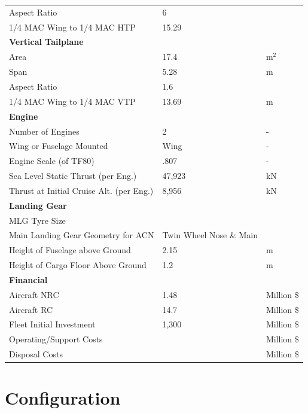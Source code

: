 \documentclass[11pt]{article}
\begin{document}
\begin{center}
\begin{longtable}{lll}
Aspect Ratio & 6 &\\
1/4 MAC Wing to 1/4 MAC HTP & 15.29 \\
\midrule
\textbf{Vertical Tailplane}\\
Area & 17.4 &m$^{2}$\\
Span & 5.28 & m\\
Aspect Ratio & 1.6 &\\
1/4 MAC Wing to 1/4 MAC VTP & 13.69&m \\
\midrule
\textbf{Engine}\\
Number of Engines & 2 & - \\
Wing or Fuselage Mounted & Wing &-\\
Engine Scale (of TF80) & .807 & - \\
Sea Level Static Thrust (per Eng.) & 47,923 &kN\\
Thrust at Initial Cruise Alt. (per Eng.) & 8,956 &kN\\
\midrule
\textbf{Landing Gear}\\
MLG Tyre Size & & \\
Main Landing Gear Geometry for ACN &Twin Wheel Nose \& Main &\\
Height of Fuselage above Ground &2.15 &m \\
Height of Cargo Floor Above Ground &1.2 &m\\
\midrule
\textbf{Financial} \\
Aircraft NRC& 1.48 &Million \$ \\
Aircraft RC& 14.7&Million \$ \\
Fleet Initial Investment &1,300 &Million \$ \\
Operating/Support Costs & &Million \$ \\
Disposal Costs & &Million \$ \\

\bottomrule
\end{longtable}
\end{center}



\section{Configuration}
\end{document}
